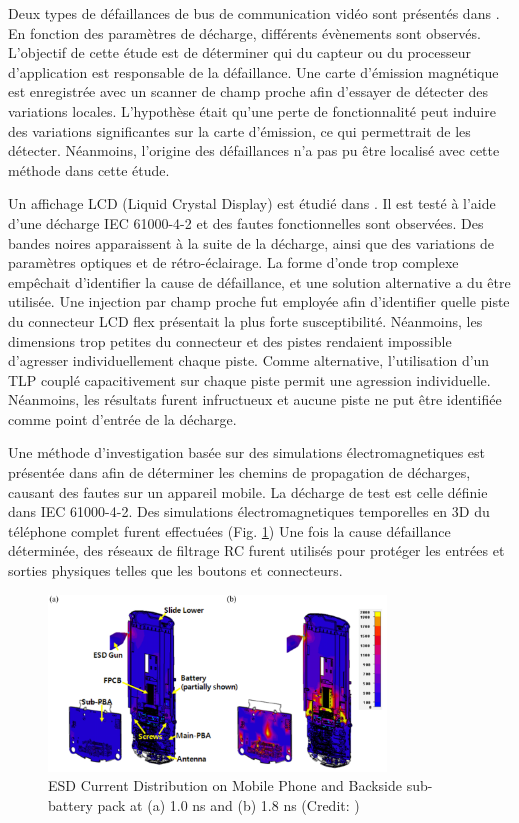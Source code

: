Deux types de défaillances de bus de communication vidéo sont présentés dans \cite{softFailSubsystem}.
En fonction des paramètres de décharge, différents évènements sont observés.
L'objectif de cette étude est de déterminer qui du capteur ou du processeur d'application est responsable de la défaillance.
Une carte d'émission magnétique est enregistrée avec un scanner de champ proche afin d'essayer de détecter des variations locales.
L'hypothèse était qu'une perte de fonctionnalité peut induire des variations significantes sur la carte d'émission, ce qui permettrait de les détecter.
Néanmoins, l'origine des défaillances n'a pas pu être localisé avec cette méthode dans cette étude.

Un affichage LCD (Liquid Crystal Display) est étudié dans \cite{softFailLCD}.
Il est testé à l'aide d'une décharge IEC 61000-4-2 \cite{iec61000-4-2} et des fautes fonctionnelles sont observées.
Des bandes noires apparaissent à la suite de la décharge, ainsi que des variations de paramètres optiques et de rétro-éclairage.
La forme d'onde trop complexe empêchait d'identifier la cause de défaillance, et une solution alternative a du être utilisée.
Une injection par champ proche fut employée afin d'identifier quelle piste du connecteur LCD flex présentait la plus forte susceptibilité.
Néanmoins, les dimensions trop petites du connecteur et des pistes rendaient impossible d'agresser individuellement chaque piste.
Comme alternative, l'utilisation d'un TLP couplé capacitivement sur chaque piste permit une agression individuelle.
Néanmoins, les résultats furent infructueux et aucune piste ne put être identifiée comme point d'entrée de la décharge.

Une méthode d'investigation basée sur des simulations électromagnetiques est présentée dans \cite{softFailMobile} afin de déterminer les chemins de propagation de décharges, causant des fautes sur un appareil mobile.
La décharge de test est celle définie dans IEC 61000-4-2.
Des simulations électromagnetiques temporelles en 3D du téléphone complet furent effectuées (Fig. \ref{fig:mobile-phone-3d-em})
Une fois la cause défaillance déterminée, des réseaux de filtrage RC furent utilisés pour protéger les entrées et sorties physiques telles que les boutons et connecteurs.

\begin{figure}[!h]
  \centering
  \includegraphics[width=0.8\textwidth]{src/1/figures/current_distribution_mobile.png}
  \caption{ESD Current Distribution on Mobile Phone and Backside sub-battery pack at (a) 1.0 ns and (b) 1.8 ns (Credit: \cite{softFailMobile})}
  \label{fig:mobile-phone-3d-em}
\end{figure}

